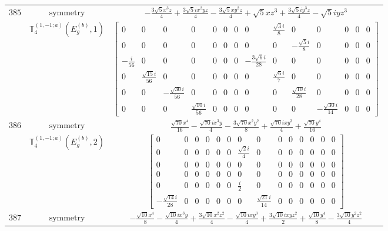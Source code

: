\documentclass[fleqn,8pt,landscape]{jsarticle}
\begin{document}
\begin{longtable}{ccc}
$ 385 $ & $ \text{symmetry} $ & $ - \frac{3 \sqrt{5} x^{3} z}{4} + \frac{3 \sqrt{5} i x^{2} y z}{4} - \frac{3 \sqrt{5} x y^{2} z}{4} + \sqrt{5} x z^{3} + \frac{3 \sqrt{5} i y^{3} z}{4} - \sqrt{5} i y z^{3} $ \\
$  $ & $ \mathbb{T}_{4}^{(1,-1;a)}(E_{g}^{(b)},1) $ & $ \begin{bmatrix} 0 & 0 & 0 & 0 & 0 & 0 & 0 & 0 & \frac{\sqrt{3} i}{8} & 0 & 0 & 0 & 0 & 0 \\ 0 & 0 & 0 & 0 & 0 & 0 & 0 & 0 & 0 & - \frac{\sqrt{5} i}{8} & 0 & 0 & 0 & 0 \\ - \frac{i}{56} & 0 & 0 & 0 & 0 & 0 & 0 & - \frac{3 \sqrt{6} i}{28} & 0 & 0 & 0 & 0 & 0 & 0 \\ 0 & \frac{\sqrt{15} i}{56} & 0 & 0 & 0 & 0 & 0 & 0 & \frac{\sqrt{6} i}{7} & 0 & 0 & 0 & 0 & 0 \\ 0 & 0 & - \frac{\sqrt{30} i}{56} & 0 & 0 & 0 & 0 & 0 & 0 & \frac{\sqrt{10} i}{28} & 0 & 0 & 0 & 0 \\ 0 & 0 & 0 & \frac{\sqrt{10} i}{56} & 0 & 0 & 0 & 0 & 0 & 0 & - \frac{\sqrt{30} i}{14} & 0 & 0 & 0 \end{bmatrix} $ \\ \hline
$ 386 $ & $ \text{symmetry} $ & $ \frac{\sqrt{70} x^{4}}{16} - \frac{\sqrt{70} i x^{3} y}{4} - \frac{3 \sqrt{70} x^{2} y^{2}}{8} + \frac{\sqrt{70} i x y^{3}}{4} + \frac{\sqrt{70} y^{4}}{16} $ \\
$  $ & $ \mathbb{T}_{4}^{(1,-1;a)}(E_{g}^{(b)},2) $ & $ \begin{bmatrix} 0 & 0 & 0 & 0 & 0 & 0 & 0 & 0 & 0 & 0 & 0 & 0 & 0 & 0 \\ 0 & 0 & 0 & 0 & 0 & 0 & \frac{\sqrt{2} i}{4} & 0 & 0 & 0 & 0 & 0 & 0 & 0 \\ 0 & 0 & 0 & 0 & 0 & 0 & 0 & 0 & 0 & 0 & 0 & 0 & 0 & 0 \\ 0 & 0 & 0 & 0 & 0 & 0 & 0 & 0 & 0 & 0 & 0 & 0 & 0 & 0 \\ 0 & 0 & 0 & 0 & 0 & 0 & \frac{i}{2} & 0 & 0 & 0 & 0 & 0 & 0 & 0 \\ - \frac{\sqrt{14} i}{28} & 0 & 0 & 0 & 0 & 0 & 0 & \frac{\sqrt{21} i}{14} & 0 & 0 & 0 & 0 & 0 & 0 \end{bmatrix} $ \\ \hline
$ 387 $ & $ \text{symmetry} $ & $ - \frac{\sqrt{10} x^{4}}{8} - \frac{\sqrt{10} i x^{3} y}{4} + \frac{3 \sqrt{10} x^{2} z^{2}}{4} - \frac{\sqrt{10} i x y^{3}}{4} + \frac{3 \sqrt{10} i x y z^{2}}{2} + \frac{\sqrt{10} y^{4}}{8} - \frac{3 \sqrt{10} y^{2} z^{2}}{4} $ \\

\end{longtable}
\end{document}
